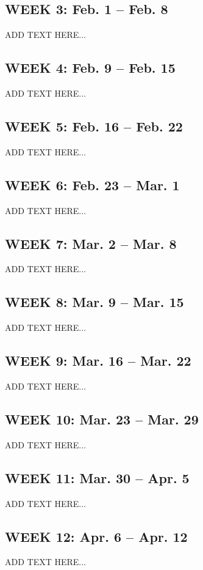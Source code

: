 \documentclass[journal,12pt,onecolumn,draftclsnofoot]{IEEEtran}
\begin{document}
%
\subsection*{WEEK 3: Feb. 1 -- Feb. 8}
ADD TEXT HERE...

%
\subsection*{WEEK 4: Feb. 9 -- Feb. 15}
ADD TEXT HERE...

%
\subsection*{WEEK 5: Feb. 16 -- Feb. 22}
ADD TEXT HERE...

%
\subsection*{WEEK 6: Feb. 23 -- Mar. 1}
ADD TEXT HERE...

%
\subsection*{WEEK 7: Mar. 2 -- Mar. 8}
ADD TEXT HERE...

%
\subsection*{WEEK 8: Mar. 9 -- Mar. 15}
ADD TEXT HERE...

%
\subsection*{WEEK 9: Mar. 16 -- Mar. 22}
ADD TEXT HERE...

%
\subsection*{WEEK 10: Mar. 23 -- Mar. 29}
ADD TEXT HERE...

%
\subsection*{WEEK 11: Mar. 30 -- Apr. 5}
ADD TEXT HERE...

%
\subsection*{WEEK 12: Apr. 6 -- Apr. 12}
ADD TEXT HERE...
\end{document}
